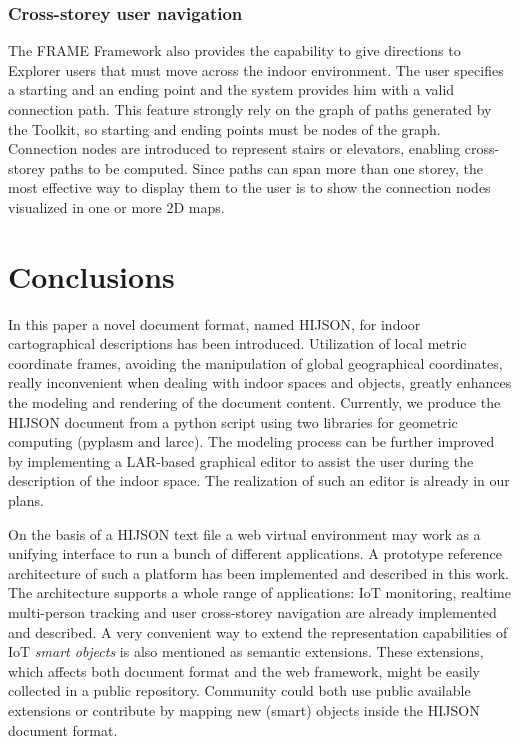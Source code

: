 \documentclass[]{egpubl}
\begin{document}
\subsubsection{Cross-storey user navigation} The FRAME Framework also provides
the capability to give directions to Explorer users that must move across the
indoor environment. The user specifies a starting and an ending point and the
system provides him with a valid connection path. This feature strongly rely
on the graph of paths generated by the Toolkit, so starting and ending points
must be nodes of the graph. Connection nodes are introduced to represent
stairs or elevators, enabling cross-storey paths to be computed. Since paths
can span more than one storey, the most effective way to display them to the
user is to show the connection nodes visualized in one or more 2D maps.


\section{Conclusions}

In this paper a novel document format, named HIJSON, for indoor cartographical
descriptions has been introduced. Utilization of local metric coordinate
frames, avoiding the manipulation of global geographical coordinates, really
inconvenient when dealing with indoor spaces and objects, greatly enhances the
modeling and rendering of the document content. Currently, we produce the
HIJSON document from a python script using two libraries for geometric
computing (pyplasm and larcc). The modeling process can be further
improved by implementing a LAR-based graphical editor to assist the user
during the description of the indoor space. The realization of such an editor
is already in our plans. 

On the basis of a HIJSON text file a  web virtual
environment may work as a unifying interface to run a bunch of
different applications. A prototype reference architecture of such a platform has been
 implemented and described in this work. The architecture supports a whole
range of applications: IoT monitoring, realtime multi-person tracking and user
cross-storey navigation are already implemented and described. A very
convenient way to extend the representation capabilities of IoT \emph{smart objects} is
also mentioned as semantic extensions. These extensions, which affects both
document format and the web framework, might be easily collected in a public
repository. Community could both use public available extensions or contribute
by mapping new (smart) objects inside the HIJSON document format.


%





\tableofcontents
\end{document}
